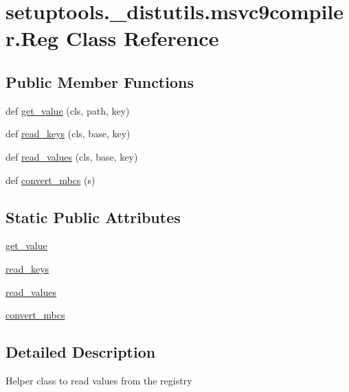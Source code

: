 \hypertarget{classsetuptools_1_1__distutils_1_1msvc9compiler_1_1Reg}{}\section{setuptools.\+\_\+distutils.\+msvc9compiler.\+Reg Class Reference}
\label{classsetuptools_1_1__distutils_1_1msvc9compiler_1_1Reg}
\subsection*{Public Member Functions}
\begin{DoxyCompactItemize}
\item 
def \hyperlink{classsetuptools_1_1__distutils_1_1msvc9compiler_1_1Reg_ac50a4b3bb7b26484fb53ba3a32eb5c8f}{get\+\_\+value} (cls, path, key)
\item 
def \hyperlink{classsetuptools_1_1__distutils_1_1msvc9compiler_1_1Reg_a8640b31f3944618f1ac9e9bb77f46234}{read\+\_\+keys} (cls, base, key)
\item 
def \hyperlink{classsetuptools_1_1__distutils_1_1msvc9compiler_1_1Reg_a3e59e7e2b3f84f476299769f9472f420}{read\+\_\+values} (cls, base, key)
\item 
def \hyperlink{classsetuptools_1_1__distutils_1_1msvc9compiler_1_1Reg_aca56b4959fda21e6abd95bfadccd45c8}{convert\+\_\+mbcs} (s)
\end{DoxyCompactItemize}
\subsection*{Static Public Attributes}
\begin{DoxyCompactItemize}
\item 
\hyperlink{classsetuptools_1_1__distutils_1_1msvc9compiler_1_1Reg_a755e23dda075408a954b0a41c25310fd}{get\+\_\+value}
\item 
\hyperlink{classsetuptools_1_1__distutils_1_1msvc9compiler_1_1Reg_a26fde2924fca32ba504cc00a04c6a357}{read\+\_\+keys}
\item 
\hyperlink{classsetuptools_1_1__distutils_1_1msvc9compiler_1_1Reg_a346ae5d8708a523acf70ff06c074d208}{read\+\_\+values}
\item 
\hyperlink{classsetuptools_1_1__distutils_1_1msvc9compiler_1_1Reg_a18d4af0e23df67efe4313c889babcba7}{convert\+\_\+mbcs}
\end{DoxyCompactItemize}


\subsection{Detailed Description}
\begin{DoxyVerb}Helper class to read values from the registry
\end{DoxyVerb}
 


